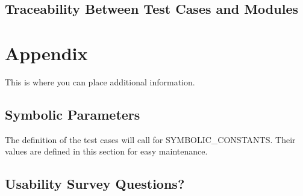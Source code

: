 \documentclass[12pt, titlepage]{article}
\begin{document}
\subsection{Traceability Between Test Cases and Modules}


\newpage





\newpage

\section{Appendix}

This is where you can place additional information.

\subsection{Symbolic Parameters}

The definition of the test cases will call for SYMBOLIC\_CONSTANTS.
Their values are defined in this section for easy maintenance.

\subsection{Usability Survey Questions?}

\end{document}
